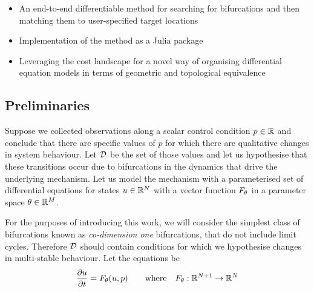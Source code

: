 \begin{itemize}
    \item An end-to-end differentiable method for searching for bifurcations and then matching them to user-specified target locations
    \item Implementation of the method as a Julia package \cite{Szep2021BifurcationFit.jlDiagrams}
    \item Leveraging the cost landscape for a novel way of organising differential equation models in terms of geometric and topological equivalence
\end{itemize}

\subsection{Preliminaries}

Suppose we collected observations along a scalar control condition $p\in\mathbb{R}$ and conclude that there are specific values of $p$ for which there are qualitative changes in system behaviour. Let $\mathcal{D}$ be the set of those values and let us hypothesise that these transitions occur due to bifurcations in the dynamics that drive the underlying mechanism. Let us model the mechanism with a parameterised set of differential equations for states $u\in\mathbb{R}^N$ with a vector function $F_{\theta}$ in a parameter space $\theta\in\mathbb{R}^M$.

For the purposes of introducing this work, we will consider the simplest class of bifurcations known as \textit{co-dimension one} bifurcations, that do not include limit cycles. Therefore $\mathcal{D}$ should contain conditions for which we hypothesise changes in multi-stable behaviour. Let the equations be
\begin{align}
	\frac{\partial u}{\partial t}=F_{\theta}(u,p)
	\qquad\mathrm{where}\quad
	F_{\theta} : \mathbb{R}^{N+1}\rightarrow\mathbb{R}^N
	\label{eq:model}
\end{align}

